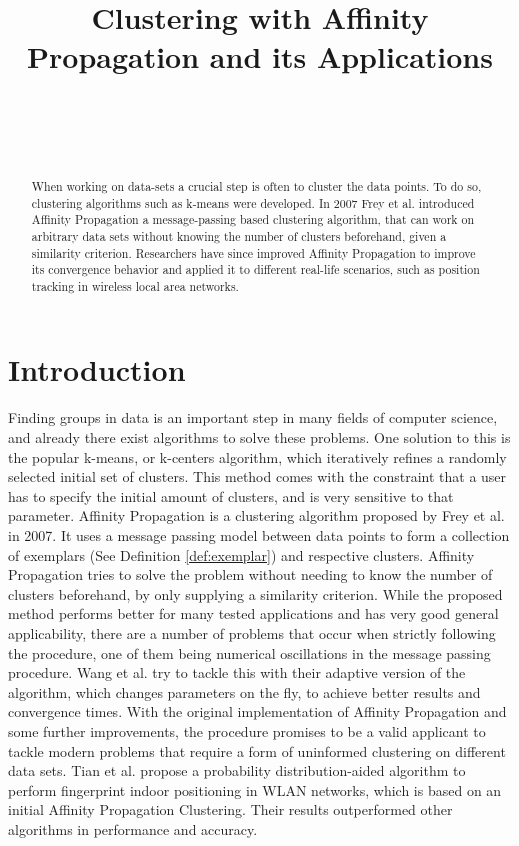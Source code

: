 \documentclass[11pt,a4paper]{article}
\title{Clustering with Affinity Propagation and its Applications}
\author{
 \authorname{Philipp-Alexander Auer} \\
 \studentnumber{01420446} \\
 \curriculum{033 535} \\
 \email{e1420446@student.tuwien.ac.at}
}
\begin{document}
\maketitle

\begin{abstract}
When working on data-sets a crucial step is often to cluster the data points. To do so, clustering algorithms such as k-means were developed. In 2007 Frey et al. introduced Affinity Propagation \cite{frey2007clustering} a message-passing based clustering algorithm, that can work on arbitrary data sets without knowing the number of clusters beforehand, given a similarity criterion. Researchers have since improved Affinity Propagation to improve its convergence behavior \cite{wang2008adaptive} and applied it to different real-life scenarios, such as position tracking in wireless local area networks. \cite{tian2013fingerprint}
\end{abstract}

\section{Introduction}

Finding groups in data is an important step in many fields of computer science, and already there exist algorithms to solve these problems. One solution to this is the popular k-means, or k-centers algorithm, which iteratively refines a randomly selected initial set of clusters. This method comes with the constraint that a user has to specify the initial amount of clusters, and is very sensitive to that parameter. \cite{frey2007clustering} 
Affinity Propagation is a clustering algorithm proposed by Frey et al. in 2007. It uses a message passing model between data points to form a collection of exemplars (See Definition \ref{def:exemplar}) and respective clusters. \cite{frey2007clustering} Affinity Propagation tries to solve the problem without needing to know the number of clusters beforehand, by only supplying a similarity criterion.
While the proposed method performs better for many tested applications \cite{frey2007clustering} and has very good general applicability, there are a number of problems that occur when strictly following the procedure, one of them being numerical oscillations in the message passing procedure. Wang et al. try to tackle this with their adaptive version of the algorithm, which changes parameters on the fly, to achieve better results and convergence times. \cite{wang2008adaptive} With the original implementation of Affinity Propagation and some further improvements, the procedure promises to be a valid applicant to tackle modern problems that require a form of uninformed clustering on different data sets. Tian et al. propose a probability distribution-aided algorithm to perform fingerprint indoor positioning in WLAN networks, which is based on an initial Affinity Propagation Clustering. Their results outperformed other algorithms in performance and accuracy. \cite{tian2013fingerprint}
\end{document}
